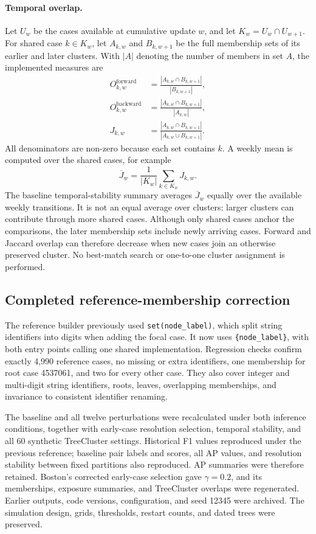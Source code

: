 \paragraph{Temporal overlap.}
Let $U_w$ be the cases available at cumulative update $w$, and let $K_w=U_w\cap U_{w+1}$. For shared case $k\in K_w$, let $A_{k,w}$ and $B_{k,w+1}$ be the full membership sets of its earlier and later clusters. With $|A|$ denoting the number of members in set $A$, the implemented measures are
\begin{align*}
    O^{\mathrm{forward}}_{k,w}
      &=\frac{|A_{k,w}\cap B_{k,w+1}|}{|B_{k,w+1}|},\\
    O^{\mathrm{backward}}_{k,w}
      &=\frac{|A_{k,w}\cap B_{k,w+1}|}{|A_{k,w}|},\\
    J_{k,w}
      &=\frac{|A_{k,w}\cap B_{k,w+1}|}{|A_{k,w}\cup B_{k,w+1}|}.
\end{align*}
All denominators are non-zero because each set contains $k$. A weekly mean is computed over the shared cases, for example
\[
    \overline J_w=\frac{1}{|K_w|}\sum_{k\in K_w}J_{k,w}.
\]
The baseline temporal-stability summary averages $\overline J_w$ equally over the available weekly transitions. It is not an equal average over clusters: larger clusters can contribute through more shared cases. Although only shared cases anchor the comparisons, the later membership sets include newly arriving cases. Forward and Jaccard overlap can therefore decrease when new cases join an otherwise preserved cluster. No best-match search or one-to-one cluster assignment is performed.

\subsection{Completed reference-membership correction}\label{sec:app_ch3_reference_audit}

The reference builder previously used \texttt{set(node\_label)}, which split string identifiers into digits when adding the focal case. It now uses \texttt{\{node\_label\}}, with both entry points calling one shared implementation. Regression checks confirm exactly 4,990 reference cases, no missing or extra identifiers, one membership for root case 4537061, and two for every other case. They also cover integer and multi-digit string identifiers, roots, leaves, overlapping memberships, and invariance to consistent identifier renaming.

The baseline and all twelve perturbations were recalculated under both inference conditions, together with early-case resolution selection, temporal stability, and all 60 synthetic TreeCluster settings. Historical F1 values reproduced under the previous reference; baseline pair labels and scores, all AP values, and resolution stability between fixed partitions also reproduced. AP summaries were therefore retained. Boston's corrected early-case selection gave $\gamma=0.2$, and its memberships, exposure summaries, and TreeCluster overlaps were regenerated. Earlier outputs, code versions, configuration, and seed 12345 were archived. The simulation design, grids, thresholds, restart counts, and dated trees were preserved.

